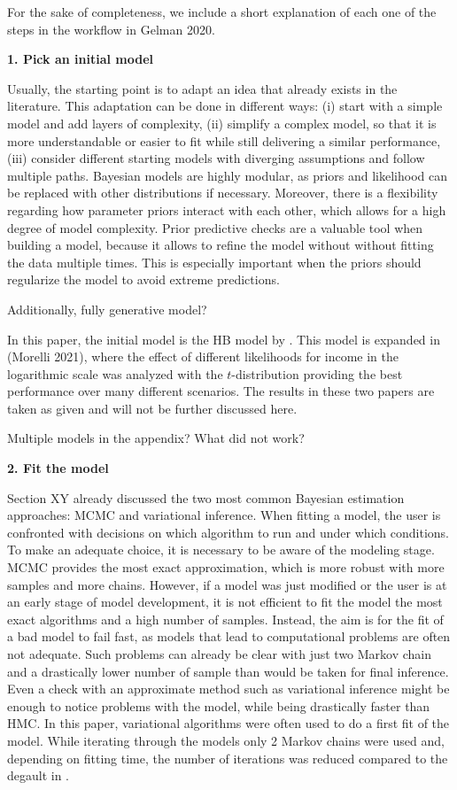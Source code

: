 For the sake of completeness, we include a short explanation of each one of the steps in the workflow in Gelman 2020.

\textbf{1. Pick an initial model}

Usually, the starting point is to adapt an idea that already exists in the literature.
This adaptation can be done in different ways: (i) start with a simple model and add layers of complexity, (ii) simplify a complex model, so that it is more understandable or easier to fit while still delivering a similar performance, (iii) consider different starting models with diverging assumptions and follow multiple paths.
Bayesian models are highly modular, as priors and likelihood can be replaced with other distributions if necessary.
Moreover, there is a flexibility regarding how parameter priors interact with each other, which allows for a high degree of model complexity.
Prior predictive checks are a valuable tool when building a model, because it allows to refine the model without without fitting the data multiple times.
This is especially important when the priors should regularize the model to avoid extreme predictions.

Additionally, fully generative model?

In this paper, the initial model is the HB model by \cite{molina_small_2014}.
This model is expanded in (Morelli 2021), where the effect of different likelihoods for income in the logarithmic scale was analyzed with the $t$-distribution providing the best performance over many different scenarios.
The results in these two papers are taken as given and will not be further discussed here.

Multiple models in the appendix? What did not work?

\textbf{2. Fit the model}

Section XY already discussed the two most common Bayesian estimation approaches: MCMC and variational inference.
When fitting a model, the user is confronted with decisions on which algorithm to run and under which conditions.
To make an adequate choice, it is necessary to be aware of the modeling stage.
MCMC provides the most exact approximation, which is more robust with more samples and more chains.
However, if a model was just modified or the user is at an early stage of model development, it is not efficient to fit the model the most exact algorithms and a high number of samples.
Instead, the aim is for the fit of a bad model to fail fast, as models that lead to computational problems are often not adequate.
Such problems can already be clear with just two Markov chain and a drastically lower number of sample than would be taken for final inference.
Even a check with an approximate method such as variational inference might be enough to notice problems with the model, while being drastically faster than HMC.
In this paper, variational algorithms were often used to do a first fit of the model.
While iterating through the models only 2 Markov chains were used and, depending on fitting time, the number of iterations was reduced compared to the degault in .


